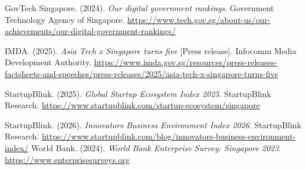 \documentclass[
  12pt,a4paper]{article}
\begin{document}
GovTech Singapore. (2024). \emph{Our digital government rankings}.
Government Technology Agency of Singapore.
\url{https://www.tech.gov.sg/about-us/our-achievements/our-digital-government-rankings/}

IMDA. (2025). \emph{Asia Tech x Singapore turns five} {[}Press
release{]}. Infocomm Media Development Authority.
\url{https://www.imda.gov.sg/resources/press-releases-factsheets-and-speeches/press-releases/2025/asia-tech-x-singapore-turns-five}

StartupBlink. (2025). \emph{Global Startup Ecosystem Index 2025}.
StartupBlink Research.
\url{https://www.startupblink.com/startup-ecosystem/singapore}

StartupBlink. (2026). \emph{Innovators Business Environment Index 2026}.
StartupBlink Research.
\url{https://www.startupblink.com/blog/innovators-business-environment-index/}
World Bank. (2024). \emph{World Bank Enterprise Survey: Singapore 2023}.
\url{https://www.enterprisesurveys.org}
\end{document}
